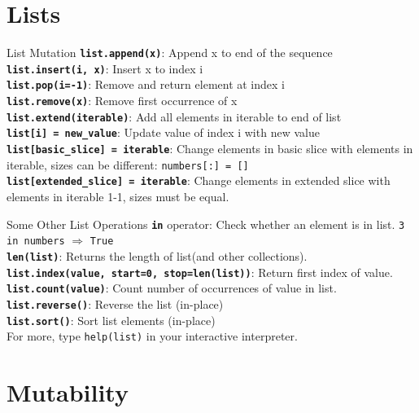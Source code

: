     \section{Lists}
    \begin{frame}{List Mutation}
        \LARGE
        \textbf{\texttt{list.append(x)}}: Append x to end of the sequence\\
        \textbf{\texttt{list.insert(i, x)}}: Insert x to index i\\
        \textbf{\texttt{list.pop(i=-1)}}: Remove and return element at index i\\
        \textbf{\texttt{list.remove(x)}}: Remove first occurrence of x\\
        \textbf{\texttt{list.extend(iterable)}}: Add all elements in iterable to end of list\\
        \textbf{\texttt{list[i] = new\_value}}: Update value of index i with new value\\
        \textbf{\texttt{list[basic\_slice] = iterable}}: Change elements in basic slice with elements in iterable, sizes can be different: \texttt{numbers[:] = []}\\
        \textbf{\texttt{list[extended\_slice] = iterable}}: Change elements in extended slice with elements in iterable 1-1, sizes must be equal.\\
    \end{frame}

    \begin{frame}{Some Other List Operations}
        \LARGE
        \textbf{\texttt{in}} operator: Check whether an element is in list. \texttt{3 in numbers} $\Rightarrow$ \texttt{True}\\
        \textbf{\texttt{len(list)}}: Returns the length of list(and other collections).\\
        \textbf{\texttt{list.index(value, start=0, stop=len(list))}}: Return first index of value.\\
        \textbf{\texttt{list.count(value)}}: Count number of occurrences of value in list.\\
        \textbf{\texttt{list.reverse()}}: Reverse the list (in-place)\\
        \textbf{\texttt{list.sort()}}: Sort list elements (in-place)\\
        For more, type \texttt{help(list)} in your interactive interpreter.
    \end{frame}

    \section{Mutability}

